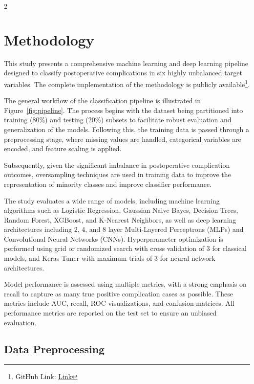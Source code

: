 \documentclass[bst/sn-nature]{sn-jnl}
\begin{document}
\begin{multicols}{2}
\section{Methodology}

\quad This study presents a comprehensive machine learning and deep learning pipeline designed to classify postoperative complications in six highly unbalanced target variables. The complete implementation of the methodology is publicly available\footnote{GitHub Link: \href{https://github.com/twallett/research/tree/main/2025/postoperative-risk-prediction}{Link}}.

The general workflow of the classification pipeline is illustrated in Figure~\ref{fig:pipeline}. The process begins with the dataset being partitioned into training (80\%) and testing (20\%) subsets to facilitate robust evaluation and generalization of the models. Following this, the training data is passed through a preprocessing stage, where missing values are handled, categorical variables are encoded, and feature scaling is applied.

Subsequently, given the significant imbalance in postoperative complication outcomes, oversampling techniques are used in training data to improve the representation of minority classes and improve classifier performance.

The study evaluates a wide range of models, including machine learning algorithms such as Logistic Regression, Gaussian Naive Bayes, Decision Trees, Random Forest, XGBoost, and K-Nearest Neighbors, as well as deep learning architectures including 2, 4, and 8 layer Multi-Layered Perceptrons (MLPs) and Convolutional Neural Networks (CNNs). Hyperparameter optimization is performed using grid or randomized search with cross validation of 3 for classical models, and Keras Tuner\cite{kerastuner} with maximum trials of 3 for neural network architectures.

Model performance is assessed using multiple metrics, with a strong emphasis on recall to capture as many true positive complication cases as possible. These metrics include AUC, recall, ROC visualizations, and confusion matrices. All performance metrics are reported on the test set to ensure an unbiased evaluation.

\subsection{Data Preprocessing}


\end{multicols}
\end{document}
